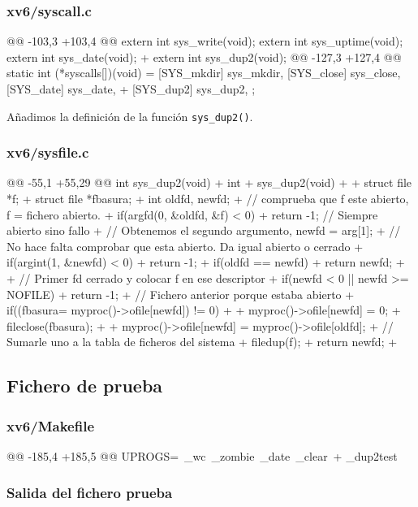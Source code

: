 \subsubsection{xv6/syscall.c}
\begin{listing}
@@ -103,3 +103,4 @@
    extern int sys_write(void);
    extern int sys_uptime(void);
    extern int sys_date(void);
+   extern int sys_dup2(void);
@@ -127,3 +127,4 @@ static int (*syscalls[])(void) = {
    [SYS_mkdir]   sys_mkdir,
    [SYS_close]   sys_close,
    [SYS_date]    sys_date,
+   [SYS_dup2]    sys_dup2,
    };
\end{listing}
\par Añadimos la definición de la función \texttt{sys\_dup2()}.

\subsubsection{xv6/sysfile.c}
\begin{listing}
@@ -55,1 +55,29 @@ int sys_dup2(void)
+   int
+   sys_dup2(void)
+   {
+       struct file *f;
+       struct file *fbasura;
+       int oldfd, newfd;
+       // comprueba que f este abierto, f = fichero abierto.
+       if(argfd(0, &oldfd, &f) < 0)
+           return -1; // Siempre abierto sino fallo
+       // Obtenemos el segundo argumento, newfd = arg[1];
+       // No hace falta comprobar que esta abierto. Da igual abierto o cerrado
+       if(argint(1, &newfd) < 0)
+           return -1;
+       if(oldfd == newfd)
+           return newfd;
+
+       // Primer fd cerrado y colocar f en ese descriptor
+       if(newfd < 0 || newfd >= NOFILE)
+           return -1;
+       // Fichero anterior porque estaba abierto
+       if((fbasura= myproc()->ofile[newfd]) != 0)
+       {
+           myproc()->ofile[newfd] = 0;
+           fileclose(fbasura);
+       }
+       myproc()->ofile[newfd] = myproc()->ofile[oldfd];
+       // Sumarle uno a la tabla de ficheros del sistema
+       filedup(f);
+       return newfd;
+   }
\end{listing}

\subsection{Fichero de prueba}
\subsubsection{xv6/Makefile}
\begin{listing}
@@ -185,4 +185,5 @@ UPROGS=\
    _wc\
    _zombie\
    _date\
    _clear\
+   _dup2test\
\end{listing}
\subsubsection{Salida del fichero prueba}
